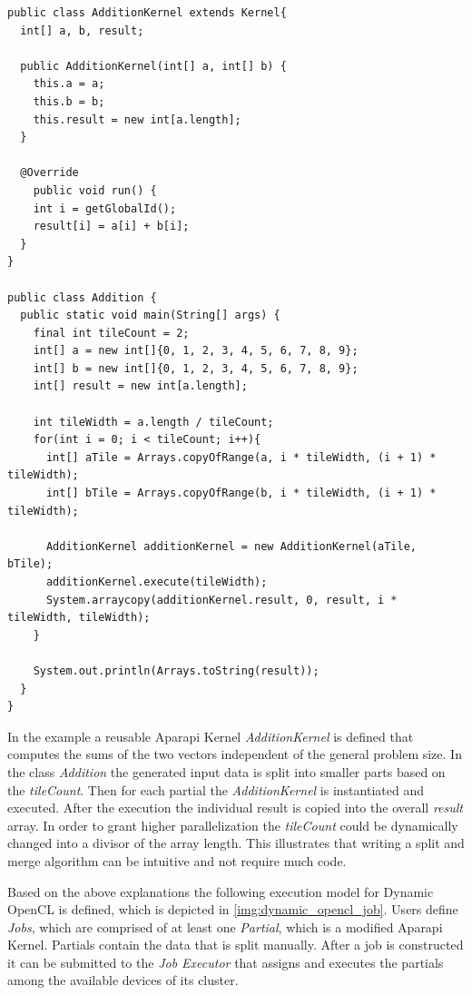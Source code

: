 \begin{minipage}{\linewidth}

\begin{lstlisting}
public class AdditionKernel extends Kernel{
  int[] a, b, result;

  public AdditionKernel(int[] a, int[] b) {
    this.a = a;
    this.b = b;
    this.result = new int[a.length];
  }

  @Override
    public void run() {
    int i = getGlobalId();
    result[i] = a[i] + b[i];
  }
}

public class Addition {
  public static void main(String[] args) {
    final int tileCount = 2;
    int[] a = new int[]{0, 1, 2, 3, 4, 5, 6, 7, 8, 9};
    int[] b = new int[]{0, 1, 2, 3, 4, 5, 6, 7, 8, 9};
    int[] result = new int[a.length];

    int tileWidth = a.length / tileCount;
    for(int i = 0; i < tileCount; i++){
      int[] aTile = Arrays.copyOfRange(a, i * tileWidth, (i + 1) * tileWidth);
      int[] bTile = Arrays.copyOfRange(b, i * tileWidth, (i + 1) * tileWidth);

      AdditionKernel additionKernel = new AdditionKernel(aTile, bTile);
      additionKernel.execute(tileWidth);
      System.arraycopy(additionKernel.result, 0, result, i * tileWidth, tileWidth);
    }

    System.out.println(Arrays.toString(result));
  }
}

\end{lstlisting}
\end{minipage}
In the example a reusable Aparapi Kernel \textit{AdditionKernel} is defined that computes the sums of the two vectors independent of the general problem size. In the class \textit{Addition} the generated input data is split into smaller parts based on the \textit{tileCount}. Then for each partial the \textit{AdditionKernel} is instantiated and executed. After the execution the individual result is copied into the overall \textit{result} array. In order to grant higher parallelization the \textit{tileCount} could be dynamically changed into a divisor of the array length. This illustrates that writing a split and merge algorithm can be intuitive and not require much code.

Based on the above explanations the following execution model for Dynamic OpenCL is defined, which is depicted in \ref{img:dynamic_opencl_job}. Users define \textit{Jobs}, which are comprised of at least one \textit{Partial}, which is a modified Aparapi Kernel. Partials contain the data that is split manually. After a job is constructed it can be submitted to the \textit{Job Executor} that assigns and executes the partials among the available devices of its cluster.

